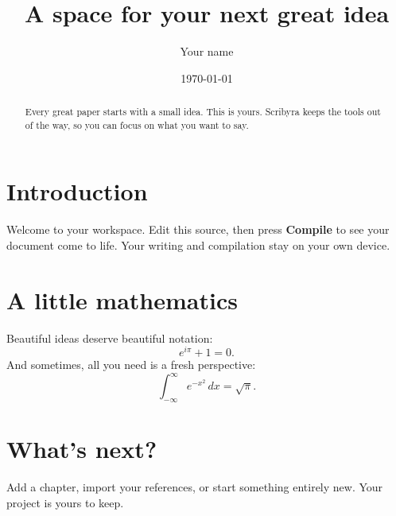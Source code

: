 \documentclass[11pt,a4paper]{article}
\title{A space for your next great idea}
\author{Your name}
\date{\today}
\begin{document}
\maketitle

\begin{abstract}
Every great paper starts with a small idea. This is yours.
Scribyra keeps the tools out of the way, so you can focus
on what you want to say.
\end{abstract}

\section{Introduction}
Welcome to your workspace. Edit this source, then press
\textbf{Compile} to see your document come to life.
Your writing and compilation stay on your own device.

\section{A little mathematics}
Beautiful ideas deserve beautiful notation:
\begin{equation}
  e^{i\pi} + 1 = 0.
\end{equation}
And sometimes, all you need is a fresh perspective:
\[
  \int_{-\infty}^{\infty} e^{-x^2}\,dx = \sqrt{\pi}.
\]

\section{What's next?}
Add a chapter, import your references, or start something
entirely new. Your project is yours to keep.
\end{document}
